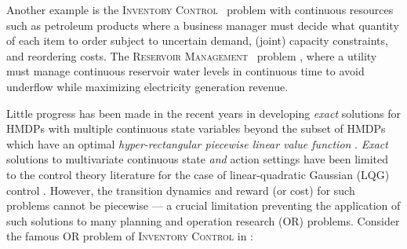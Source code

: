 \documentclass[twoside,11pt]{article}
\newcommand{\InventoryControl}{\textsc{Inventory Control }}
\newcommand{\WaterReservoir}{\textsc{Reservoir Management }}
\begin{document}
Another example is the \InventoryControl\ problem \cite{Scarf_Karlin58} with continuous resources such as petroleum products where a business manager must decide what quantity of each item to order subject to uncertain demand, (joint) capacity constraints, and reordering costs. The \WaterReservoir\ problem \cite{reservoir}, where a utility must manage continuous reservoir water levels in continuous time to avoid underflow while maximizing electricity generation revenue.

Little progress has been made in the recent years in developing \emph{exact} solutions for HMDPs with multiple continuous state variables beyond the subset of HMDPs  which have an optimal \emph{hyper-rectangular piecewise linear value function} \cite{feng04,li05}. \emph{Exact} solutions to multivariate continuous state \emph{and} action settings have been limited to the control theory literature for the case of linear-quadratic Gaussian (LQG) control \cite{lqgc}. 
However, the transition dynamics and reward (or cost) for such problems cannot be piecewise --- a crucial limitation preventing the application of such solutions to many planning and operation research (OR) problems. 
Consider the famous OR problem of \InventoryControl in \cite{Scarf_Karlin58}: 
\end{document}
